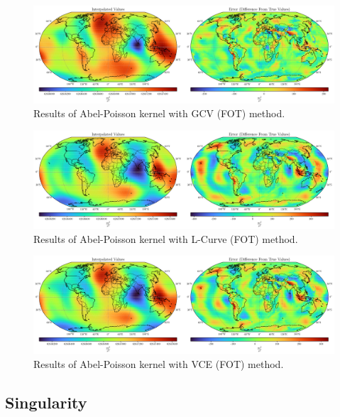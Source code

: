 \documentclass[12pt]{article}
\begin{document}
	\clearpage
	
	\begin{figure}[h!]
		\centering
		\includegraphics[width=16cm]{../Outputs/Plots/Plot_Abel-Poisson_GCV.pdf}
		\caption{Results of Abel-Poisson kernel with GCV (FOT) method.}
		\label{fig:Abel-Poisson_GCV}
	\end{figure}
	
	\begin{figure}[h!]
		\centering
		\includegraphics[width=16cm]{../Outputs/Plots/Plot_Abel-Poisson_L-Curve.pdf}
		\caption{Results of Abel-Poisson kernel with L-Curve (FOT) method.}
		\label{fig:Abel-Poisson_L-Curve}
	\end{figure}

	\begin{figure}[h!]
		\centering
		\includegraphics[width=16cm]{../Outputs/Plots/Plot_Abel-Poisson_VCE.pdf}
		\caption{Results of Abel-Poisson kernel with VCE (FOT) method.}
		\label{fig:Abel-Poisson_VCE}
	\end{figure}
	
	\subsection{Singularity}
	
\end{document}
